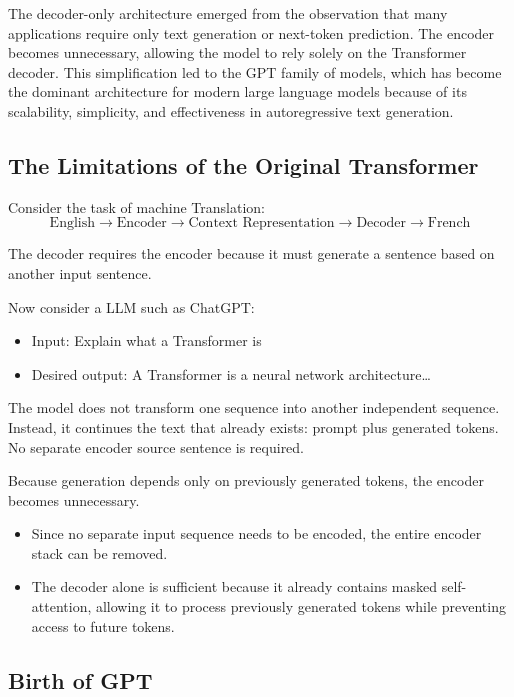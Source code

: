 The decoder-only architecture emerged from the observation that many applications require only text generation or next-token prediction. The encoder becomes unnecessary, allowing the model to rely solely on the Transformer decoder. This simplification led to the GPT family of models, which has become the dominant architecture for modern large language models because of its scalability, simplicity, and effectiveness in autoregressive text generation.

\subsection{The Limitations of the Original Transformer}

Consider the task of machine Translation:
\begin{equation*}
\text{English} \longrightarrow \text{Encoder} \longrightarrow \text{Context Representation} \longrightarrow \text{Decoder} \longrightarrow \text{French}
\end{equation*}

The decoder requires the encoder because it must generate a sentence based on another input sentence.

Now consider a LLM such as ChatGPT:
\begin{itemize}
    \item Input: Explain what a Transformer is
    \item Desired output: A Transformer is a neural network architecture\dots
\end{itemize}

The model does not transform one sequence into another independent sequence. Instead, it continues the text that already exists: prompt plus generated tokens. No separate encoder source sentence is required.

Because generation depends only on previously generated tokens, the encoder becomes unnecessary.
\begin{itemize}
    \item Since no separate input sequence needs to be encoded, the entire encoder stack can be removed.
    \item The decoder alone is sufficient because it already contains masked self-attention, allowing it to process previously generated tokens while preventing access to future tokens.
\end{itemize}

\subsection{Birth of GPT}

